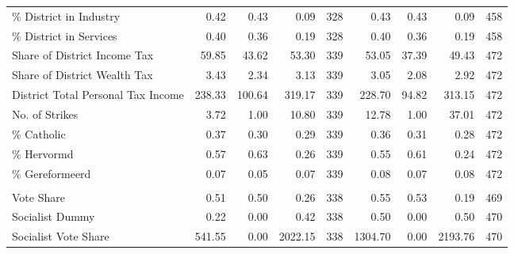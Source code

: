 \begin{table}[!h]
{\begin{threeparttable}
\begin{tabular}[t]{lrrrrrrrr}
\hspace{1em}\% District in Industry & \num{0.42} & \num{0.43} & \num{0.09} & 328 & \num{0.43} & \num{0.43} & \num{0.09} & 458\\
\hspace{1em}\% District in Services & \num{0.40} & \num{0.36} & \num{0.19} & 328 & \num{0.40} & \num{0.36} & \num{0.19} & 458\\
\hspace{1em}Share of District Income Tax & \num{59.85} & \num{43.62} & \num{53.30} & 339 & \num{53.05} & \num{37.39} & \num{49.43} & 472\\
\hspace{1em}Share of District Wealth Tax & \num{3.43} & \num{2.34} & \num{3.13} & 339 & \num{3.05} & \num{2.08} & \num{2.92} & 472\\
\hspace{1em}District Total Personal Tax Income & \num{238.33} & \num{100.64} & \num{319.17} & 339 & \num{228.70} & \num{94.82} & \num{313.15} & 472\\
\hspace{1em}No. of Strikes & \num{3.72} & \num{1.00} & \num{10.80} & 339 & \num{12.78} & \num{1.00} & \num{37.01} & 472\\
\hspace{1em}\% Catholic & \num{0.37} & \num{0.30} & \num{0.29} & 339 & \num{0.36} & \num{0.31} & \num{0.28} & 472\\
\hspace{1em}\% Hervormd & \num{0.57} & \num{0.63} & \num{0.26} & 339 & \num{0.55} & \num{0.61} & \num{0.24} & 472\\
\hspace{1em}\% Gereformeerd & \num{0.07} & \num{0.05} & \num{0.07} & 339 & \num{0.08} & \num{0.07} & \num{0.08} & 472\\
\addlinespace[0.3em]
\multicolumn{9}{l}{\textbf{Panel D: Electoral Characteristics}}\\
\hspace{1em}Vote Share & \num{0.51} & \num{0.50} & \num{0.26} & 338 & \num{0.55} & \num{0.53} & \num{0.19} & 469\\
\hspace{1em}Socialist Dummy & \num{0.22} & \num{0.00} & \num{0.42} & 338 & \num{0.50} & \num{0.00} & \num{0.50} & 470\\
\hspace{1em}Socialist Vote Share & \num{541.55} & \num{0.00} & \num{2022.15} & 338 & \num{1304.70} & \num{0.00} & \num{2193.76} & 470\\

\end{tabular}
\end{threeparttable}}
\end{table}
